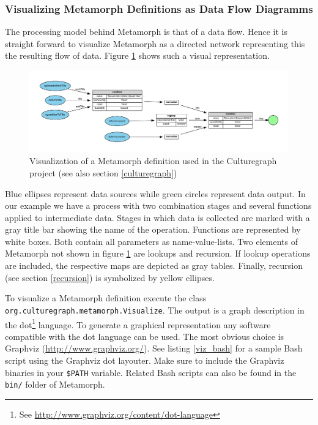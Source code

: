 \documentclass[12pt,a4paper]{article}
\begin{document}
\subsubsection{Visualizing Metamorph Definitions as Data Flow Diagramms}\label{vis}

The processing model behind Metamorph is that of a data flow. Hence it is straight forward to visualize Metamorph as a directed network representing this the resulting flow of data. Figure \ref{fig:match-title} shows such a visual representation. 

\begin{figure}[htp]
\centering
\includegraphics[width=1\textwidth]{figures/match-title}
\caption{Visualization of a Metamorph definition used in the Culturegraph project (see also section \ref{culturegraph})}\label{fig:match-title}
\end{figure}

Blue ellipses represent data sources while green circles represent data output. In our example we have a process with two combination stages and several functions applied to intermediate data. Stages in which data is collected are marked with a gray title bar showing the name of the operation. Functions are represented by white boxes. Both contain all parameters as name-value-lists. 
Two elements of Metamorph not shown in figure \ref{fig:match-title} are lookups and recursion. If lookup operations are included, the respective maps are depicted as gray tables. Finally, recursion (see section \ref{recursion}) is symbolized by yellow ellipses.

To visualize a Metamorph definition execute the class {\tt org.\-culturegraph.\-metamorph.\-Visualize}. The output is a graph description in the dot\footnote{See \url{http://www.graphviz.org/content/dot-language}} language. To generate a graphical representation any software compatible with the dot language can be used. The most obvious choice is Graphviz (\url{http://www.graphviz.org/}). See listing \ref{viz_bash} for a sample Bash script using the Graphviz dot layouter. Make sure to include the Graphviz binaries in your {\tt \$PATH} variable. Related Bash scripts can also be found in the {\tt bin/} folder of Metamorph.
\end{document}
